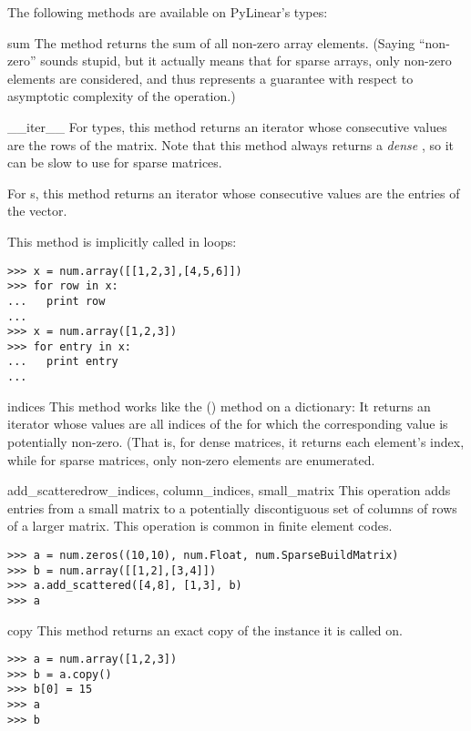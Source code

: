 The following methods are available on PyLinear's  types:
\begin{methoddesc}[Array]{sum}{}
  The  method returns the sum of all non-zero array elements. (Saying
  ``non-zero'' sounds stupid, but it actually means that for sparse arrays,
  only non-zero elements are considered, and thus represents a guarantee
  with respect to asymptotic complexity of the operation.)
\end{methoddesc}
\begin{methoddesc}[Array]{__iter__}{}
  For  types, this method returns an iterator whose
  consecutive values are the rows of the matrix. Note that this method
  always returns a \emph{dense} , so it can be slow
  to use for sparse matrices.

  For s, this method returns an iterator whose
  consecutive values are the entries of the vector.

  This method is implicitly called in  loops:
\begin{verbatim}
>>> x = num.array([[1,2,3],[4,5,6]])
>>> for row in x:
...   print row
...
>>> x = num.array([1,2,3])
>>> for entry in x:
...   print entry
...
\end{verbatim}
\end{methoddesc}
\begin{methoddesc}[Array]{indices}{}
  This method works like the () method on a
  dictionary: It returns an iterator whose values are all indices
  of the  for which the corresponding value is
  potentially non-zero. (That is, for dense matrices, it returns
  each element's index, while for sparse matrices, only non-zero
  elements are enumerated.
\end{methoddesc}
\begin{methoddesc}[Matrix]{add_scattered}{row_indices, column_indices, small_matrix}
  This operation adds entries from a small matrix to a potentially 
  discontiguous set of columns of rows of a larger matrix.
  This operation is common in finite element codes.
\begin{verbatim}
>>> a = num.zeros((10,10), num.Float, num.SparseBuildMatrix)
>>> b = num.array([[1,2],[3,4]])
>>> a.add_scattered([4,8], [1,3], b)
>>> a
\end{verbatim}
\end{methoddesc}
\begin{methoddesc}[Array]{copy}{}
  This method returns an exact copy of the instance it is 
  called on.
\begin{verbatim}
>>> a = num.array([1,2,3])
>>> b = a.copy()
>>> b[0] = 15
>>> a
>>> b
\end{verbatim}
\end{methoddesc}
